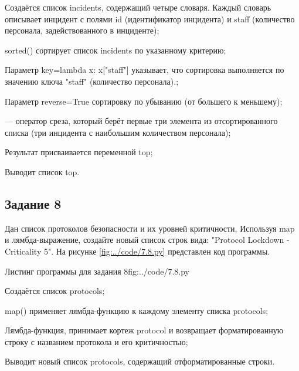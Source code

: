 \documentclass{vvsu}
\begin{document}
\begin{vvsu_list}
  \item Создаётся список incidents, содержащий четыре словаря. Каждый словарь описывает инцидент с полями id (идентификатор инцидента) и staff (количество персонала, задействованного в инциденте);
  \item sorted() сортирует список incidents по указанному критерию;
  \item Параметр key=lambda x: x["staff"] указывает, что сортировка выполняется по значению ключа "staff" (количество персонала).;
  \item Параметр reverse=True сортировку по убыванию (от большего к меньшему);
  \item [:3] — оператор среза, который берёт первые три элемента из отсортированного списка (три инцидента с наибольшим количеством персонала);
  \item Результат присваивается переменной top;
\end{vvsu_list}
  Выводит список top.

\subsection{Задание 8}
  Дан список протоколов безопасности и их уровней критичности, Используя map и лямбда-выражение, создайте новый список строк вида: "Protocol Lockdown - Criticality 5".
На рисунке \ref{fig:../code/7.8.py} представлен код программы.

\begin{vvsu_figure}{Листинг программы для задания 8}{fig:../code/7.8.py}
  \begin{minipage}{.75\textwidth}
    
  \end{minipage}
\end{vvsu_figure}

\begin{vvsu_list}
  \item Создаётся список protocols;
  \item map() применяет лямбда-функцию к каждому элементу списка protocols;
  \item Лямбда-функция, принимает кортеж protocol и возвращает форматированную строку с названием протокола и его критичностью;
\end{vvsu_list}
Выводит новый список protocols, содержащий отформатированные строки.
\end{document}
